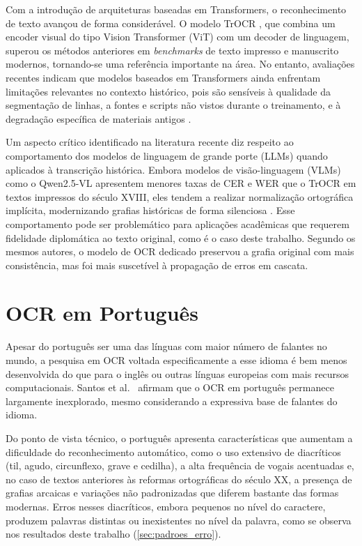 \documentclass[noabntexcite,oneside]{ufsc-thesis-rn46-2019}
\begin{document}
Com a introdução de arquiteturas baseadas em Transformers, o reconhecimento de texto
avançou de forma considerável. O modelo TrOCR \cite{huang2021}, que combina um encoder
visual do tipo Vision Transformer (ViT) com um decoder de linguagem, superou os métodos
anteriores em \textit{benchmarks} de texto impresso e manuscrito modernos, tornando-se
uma referência importante na área. No entanto, avaliações recentes indicam que modelos baseados em
Transformers ainda enfrentam limitações relevantes no contexto histórico, pois são
sensíveis à qualidade da segmentação de linhas, a fontes e scripts não vistos durante o
treinamento, e à degradação específica de materiais antigos \cite{vesalainen2025}.

Um aspecto crítico identificado na literatura recente diz respeito ao comportamento dos
modelos de linguagem de grande porte (LLMs) quando aplicados à transcrição histórica.
Embora modelos de visão-linguagem (VLMs) como o Qwen2.5-VL apresentem menores taxas de CER
e WER que o TrOCR em textos impressos do século XVIII, eles
tendem a realizar normalização ortográfica implícita, modernizando grafias históricas de
forma silenciosa \cite{vesalainen2025}. Esse comportamento pode ser problemático para
aplicações acadêmicas que requerem fidelidade diplomática ao texto original, como é o
caso deste trabalho. Segundo os mesmos autores, o modelo de OCR dedicado preservou a
grafia original com mais consistência, mas foi mais suscetível à propagação de erros em
cascata.

\section{OCR em Português}
\label{sec:ocr_portugues}

Apesar do português ser uma das línguas com maior número de falantes no mundo, a
pesquisa em OCR voltada especificamente a esse idioma é bem menos desenvolvida do que
para o inglês ou outras línguas europeias com mais recursos computacionais. Santos
et al.\ \cite{santos2023} afirmam que o OCR em português permanece
largamente inexplorado, mesmo considerando a expressiva base de falantes do idioma.

Do ponto de vista técnico, o português apresenta características que aumentam a
dificuldade do reconhecimento automático, como o uso extensivo de diacríticos (til,
agudo, circunflexo, grave e cedilha), a alta frequência de vogais acentuadas e, no caso
de textos anteriores às reformas ortográficas do século XX, a presença de grafias
arcaicas e variações não padronizadas que diferem bastante das formas modernas.
Erros nesses diacríticos, embora pequenos no nível do caractere, produzem palavras
distintas ou inexistentes no nível da palavra, como se observa nos resultados deste
trabalho (\autoref{sec:padroes_erro}).
\end{document}
